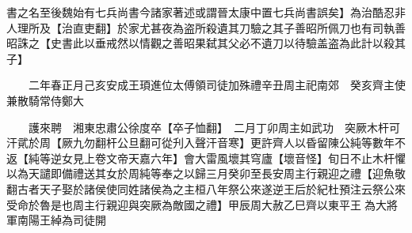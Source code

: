 書之名至後魏始有七兵尚書今諸家著述或謂晉太康中置七兵尚書誤矣】為治酷忍非人理所及【治直吏翻】於家尤甚夜為盗所殺遺其刀驗之其子善昭所佩刀也有司執善昭誅之【史書此以垂戒然以情觀之善昭果弑其父必不遺刀以待驗盖盗為此計以殺其子】

　　二年春正月己亥安成王頊進位太傅領司徒加殊禮辛丑周主祀南郊　癸亥齊主使兼散騎常侍鄭大

　　護來聘　湘東忠肅公徐度卒【卒子恤翻】　二月丁卯周主如武功　突厥木杆可汗貮於周【厥九勿翻杆公旦翻可從刋入聲汗音寒】更許齊人以昏留陳公純等數年不返【純等逆女見上卷文帝天嘉六年】會大雷風壞其穹廬【壞音怪】旬日不止木杆懼以為天譴即備禮送其女於周純等奉之以歸三月癸卯至長安周主行親迎之禮【迎魚敬翻古者天子娶於諸侯使同姓諸侯為之主桓八年祭公來遂逆王后於紀杜預注云祭公來受命於魯是也周主行親迎與突厥為敵國之禮】甲辰周大赦乙巳齊以東平王為大將軍南陽王綽為司徒開

